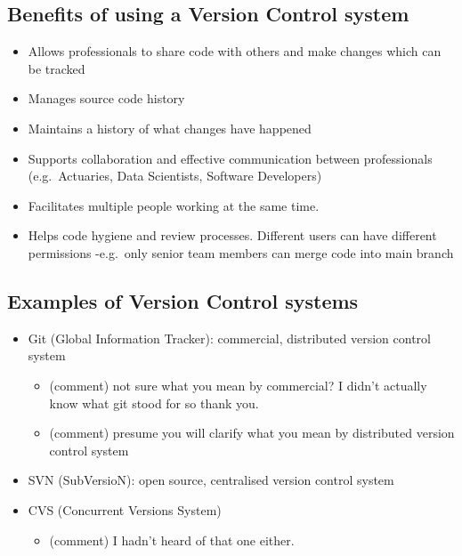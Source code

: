 \documentclass[
]{article}
\providecommand{\tightlist}{%
  \setlength{\itemsep}{0pt}\setlength{\parskip}{0pt}}
\begin{document}
\hypertarget{benefits-of-using-a-version-control-system}{%
\subsection{Benefits of using a Version Control
system}\label{benefits-of-using-a-version-control-system}}

\begin{itemize}
\tightlist
\item
  Allows professionals to share code with others and make changes which
  can be tracked
\item
  Manages source code history
\item
  Maintains a history of what changes have happened
\item
  Supports collaboration and effective communication between
  professionals (e.g.~Actuaries, Data Scientists, Software Developers)
\item
  Facilitates multiple people working at the same time.
\item
  Helps code hygiene and review processes. Different users can have
  different permissions -e.g.~only senior team members can merge code
  into main branch
\end{itemize}

\hypertarget{examples-of-version-control-systems}{%
\subsection{Examples of Version Control
systems}\label{examples-of-version-control-systems}}

\begin{itemize}
\item
  Git (Global Information Tracker): commercial, distributed version
  control system

  \begin{itemize}
  \tightlist
  \item
    (comment) not sure what you mean by commercial? I didn't actually
    know what git stood for so thank you.
  \item
    (comment) presume you will clarify what you mean by distributed
    version control system
  \end{itemize}
\item
  SVN (SubVersioN): open source, centralised version control system
\item
  CVS (Concurrent Versions System)

  \begin{itemize}
  \tightlist
  \item
    (comment) I hadn't heard of that one either.
  \end{itemize}
\end{itemize}
\end{document}
